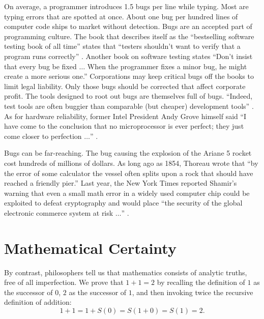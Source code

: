 \documentclass{llncs}
\begin{document}
  On average,
a programmer introduces 1.5 bugs per line while typing.
Most are typing errors that are spotted at once.
About one bug per hundred lines of computer code ships  to
market without detection.  Bugs are an accepted
part of programming culture.
The book that describes itself as the ``bestselling software testing
book of all time'' states that ``testers shouldn't want to verify
that a program runs correctly'' \cite{KFN}.
Another book on software
testing states ``Don't insist that every bug be fixed $\ldots$
When the programmer fixes a minor bug, he might create
a more serious one.''  Corporations may keep critical bugs
off the books to
limit legal liability.
 Only those bugs should be corrected
that affect corporate profit.
The tools designed to root out bugs are themselves
full of bugs. ``Indeed, test tools are often buggier than
comparable (but cheaper) development tools''
\cite{KBP}.
As for hardware reliability, former 
Intel President Andy Grove himself said 
``I have come to the conclusion that no microprocessor is ever
perfect; they just come closer to perfection $\ldots$''
\cite[p.221]{Mac}.


Bugs can be far-reaching.
The bug causing the 
explosion of the Ariane 5 rocket cost hundreds of millions
of dollars.  As long ago as 1854, Thoreau wrote that 
``by the error of some calculator
the vessel often splits upon a rock that should have reached
a friendly pier.''  %
Last year, the New York Times reported Shamir's warning that
even a small math error in a widely used computer chip could 
be exploited to defeat cryptography and would
place
``the security of the global electronic commerce system at risk
$\ldots$'' \cite{NYT}.





\section{Mathematical Certainty}

By contrast, philosophers tell us that
mathematics consists of analytic truths,
free of all imperfection.  We prove that $1+1=2$ by
recalling the definition of $1$ as the successor of $0$,
$2$ as the successor of $1$, and then invoking twice the recursive
definition
of addition: 
  $$1+1 = 1 + S(0) = S(1 + 0) = S(1) = 2.$$
\end{document}
